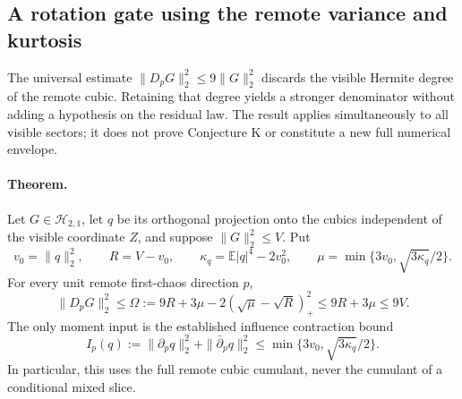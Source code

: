 \subsection{A rotation gate using the remote variance and kurtosis}
\label{sec:remote-sensitive-rotation}

The universal estimate $\|D_pG\|_2^2\le9\|G\|_2^2$ discards the
visible Hermite degree of the remote cubic. Retaining that degree yields
a stronger denominator without adding a hypothesis on the residual law.
The result applies simultaneously to all visible sectors; it does not
prove Conjecture K or constitute a new full numerical envelope.

\paragraph{Theorem.}
Let $G\in\mathcal H_{2,1}$, let $q$ be its orthogonal projection onto the
cubics independent of the visible coordinate $Z$, and suppose
$\|G\|_2^2\le V$. Put
\[
 v_0=\|q\|_2^2,\qquad R=V-v_0,\qquad
 \kappa_q=\mathbb E|q|^4-2v_0^2,\qquad
 \mu=\min\{3v_0,\sqrt{3\kappa_q}/2\}.
\]
For every unit remote first-chaos direction $p$,
\begin{equation}\label{eq:remote-rotation-omega}
 \|D_pG\|_2^2\le
 \Omega:=9R+3\mu-2(\sqrt\mu-\sqrt R)_+^2
 \le9R+3\mu\le9V.
\end{equation}
The only moment input is the established influence contraction bound
\[
 I_p(q):=\|\partial_pq\|_2^2+\|\bar\partial_pq\|_2^2
 \le\min\{3v_0,\sqrt{3\kappa_q}/2\}.
\]
In particular, this uses the full remote cubic cumulant, never the
cumulant of a conditional mixed slice.

